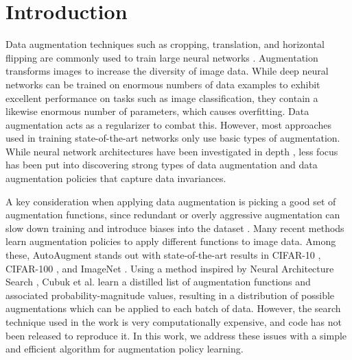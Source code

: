 \documentclass{article}
\begin{document}
\section{Introduction}
\label{intro}

Data augmentation techniques such as cropping, translation, and horizontal flipping are commonly used to train large neural networks \cite{nin}. Augmentation transforms images to increase the diversity of image data. While deep neural networks can be trained on enormous numbers of data examples to exhibit excellent performance on tasks such as image classification, they contain a likewise enormous number of parameters, which causes overfitting. Data augmentation acts as a regularizer to combat this. However, most approaches used in training state-of-the-art networks only use basic types of augmentation. While neural network architectures have been investigated in depth \cite{alexnet, resnet, googlenet, vgg, wrn, densenet, pyramidnet}, less focus has been put into discovering strong types of data augmentation and data augmentation policies that capture data invariances.

A key consideration when applying data augmentation is picking a good set of augmentation functions, since redundant or overly aggressive augmentation can slow down training and introduce biases into the dataset \cite{Graham14a}. Many recent methods learn augmentation policies to apply different functions to image data. Among these, AutoAugment \cite{autoaug} stands out with state-of-the-art results in CIFAR-10 \cite{cifar}, CIFAR-100 \cite{cifar}, and ImageNet \cite{imagenet}. Using a method inspired by Neural Architecture Search \cite{NAS1}, Cubuk et al. learn a distilled list of augmentation functions and associated probability-magnitude values, resulting in a distribution of possible augmentations which can be applied to each batch of data. However, the search technique used in the work is very computationally expensive, and code has not been released to reproduce it. In this work, we address these issues with a simple and efficient algorithm for augmentation policy learning.
\end{document}
